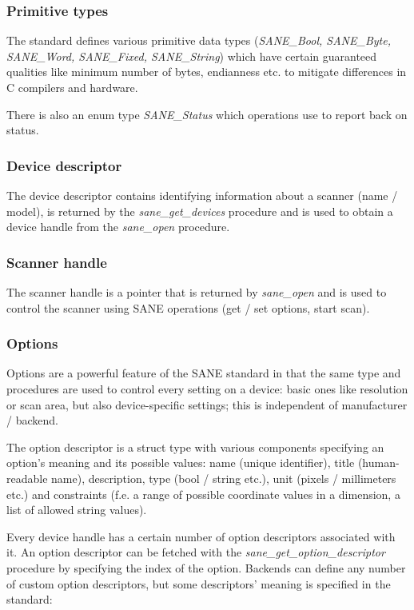 \documentclass{article}
\begin{document}
\subsubsection{Primitive types}

The standard defines various primitive data types
({\it SANE\_Bool, SANE\_Byte, SANE\_Word, SANE\_Fixed, SANE\_String})
which have certain guaranteed qualities
like minimum number of bytes, endianness etc. to mitigate differences in
C compilers and hardware.

There is also an enum type {\it SANE\_Status} which operations use to report back on
status.

\subsubsection{Device descriptor}

The device descriptor contains identifying information about a scanner (name / model),
is returned by the {\it sane\_get\_devices} procedure and is used to obtain a device handle
from the {\it sane\_open} procedure.

\subsubsection{Scanner handle}

The scanner handle is a pointer that is returned by {\it sane\_open} and is used to
control the scanner using SANE operations (get / set options, start scan).

\subsubsection{Options}

Options are a powerful feature of the SANE standard in that the same type and procedures
are used to control every setting on a device: basic ones like resolution or scan area, but also
device-specific settings; this is independent of manufacturer / backend.

The option descriptor is a struct type with various components specifying an option's
meaning and its possible values: name (unique identifier),
title (human-readable name), description, type (bool / string etc.), unit (pixels / millimeters etc.)
and constraints (f.e. a range of possible coordinate values in a dimension,
a list of allowed string values). \cite[4.2.9]{sane_standard}

Every device handle has a certain number of option descriptors associated
with it. An option descriptor can be fetched with the {\it sane\_get\_option\_descriptor}
procedure by specifying the index of the option.
Backends can define any number of custom option descriptors, but some
descriptors' meaning is specified in the standard:
\end{document}
